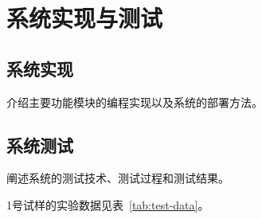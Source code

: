 

\chapter{系统实现与测试}

\section{系统实现}
介绍主要功能模块的编程实现以及系统的部署方法。

\section{系统测试}
阐述系统的测试技术、测试过程和测试结果。





1号试样的实验数据见表~\ref{tab:test-data}。

